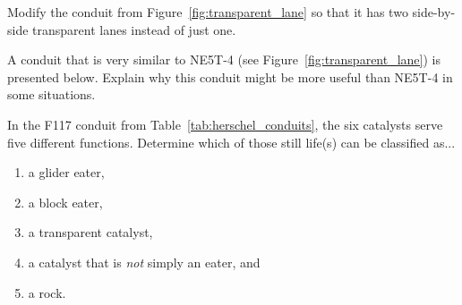 \begin{multicols}{2}
\begin{problem}
	\end{problem}
	
	
	\mfilbreak
	
	
	\begin{problemstar}\label{exer:two_transparent_lanes} 
		Modify the conduit from Figure~\ref{fig:transparent_lane} so that it has two side-by-side transparent lanes instead of just one.
		
	\end{problemstar}
	
	
	\mfilbreak
	
	
	\begin{problemstar}\label{exer:H_to_G_transparent_better} 
		A conduit that is very similar to NE5T-4 (see Figure~\ref{fig:transparent_lane}) is presented below. Explain why this conduit might be more useful than NE5T-4 in some situations.
		
		\begin{center}
		\end{center}
	\end{problemstar}


	\mfilbreak
	
	
	\begin{problem}\label{exer:stable_catalysists_F117} 
		In the F117 conduit from Table~\ref{tab:herschel_conduits}, the six catalysts serve five different functions. Determine which of those still life(s) can be classified as...\smallskip
		
		\begin{enumerate}[label=\bf\color{ocre}(\alph*)]
			\item a glider eater,
			
			\item a block eater,
			
			\item a transparent catalyst,
			
			\item a catalyst that is \emph{not} simply an eater, and
			
			\item a rock.
		\end{enumerate}
	\end{problem}


	\mfilbreak
	

\end{multicols}
